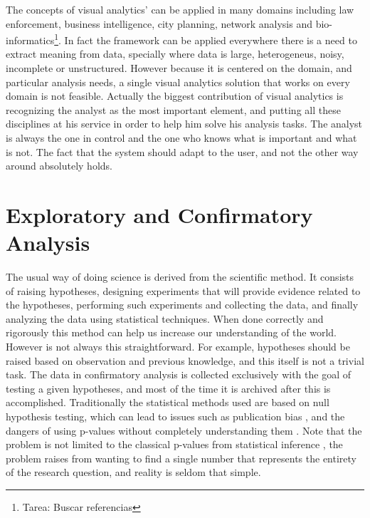 The concepts of visual analytics'  can be applied in many domains including law enforcement, business intelligence, city planning, network analysis and bio-informatics\footnote{Tarea: Buscar referencias}. In fact the framework can be applied everywhere there is a need to extract meaning from data, specially where data is large, heterogeneus, noisy, incomplete or unstructured. However because it is centered on the domain, and particular analysis needs, a single visual analytics solution that works on every domain is not feasible. Actually the biggest contribution of visual analytics is recognizing the analyst as the most important element, and putting all these disciplines at his service in order to help him solve his analysis tasks. The analyst is always the one in control and the one who knows what is important and what is not. The fact that the system should adapt to the user, and not the other way around \autocite{norman_design_2002} absolutely holds. 



\section{Exploratory and Confirmatory Analysis}

The usual way of doing science is derived from the scientific method. It consists of raising hypotheses, designing experiments that will provide evidence related to the hypotheses, performing such experiments and collecting the data, and finally analyzing the data using statistical techniques. When done correctly and rigorously this method can help us increase our understanding of the world. However is not always this straightforward. For example, hypotheses should be raised based on observation and previous knowledge, and this itself is not a trivial task. The data in confirmatory analysis is collected exclusively with the goal of testing a given hypotheses, and most of the time it is archived after this is accomplished. Traditionally the statistical methods used are based on null hypothesis testing, which can lead to issues such as publication bias \autocite{ioannidis_why_2005}, and the dangers of using p-values without completely understanding them \autocite{halsey_fickle_2015, nuzzo_scientific_2014, woolston_psychology_2015}. Note that the problem is not limited to the classical p-values from statistical inference \autocite{gelman_so-called_2011}, the problem raises from wanting to find a single number that represents the entirety of the research question, and reality is seldom that simple.    

